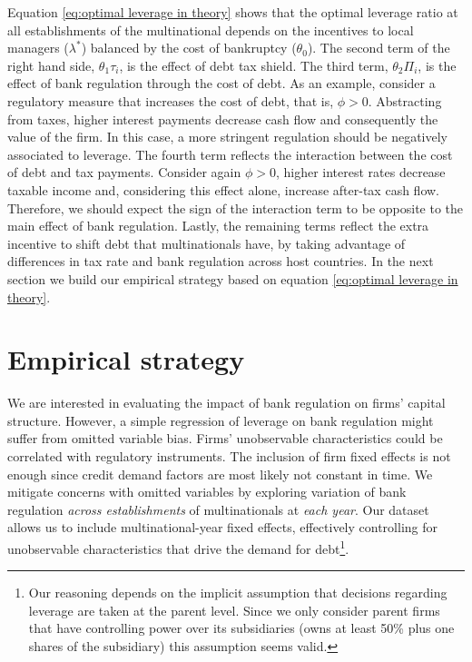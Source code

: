 \documentclass[12pt]{article}
\begin{document}
    Equation \ref{eq:optimal leverage in theory} shows that the optimal leverage ratio at all establishments of the multinational depends on the incentives to local managers ($\lambda^*$) balanced by the cost of bankruptcy ($\theta_0$). The second term of the right hand side, $\theta_1\tau_i$, is the effect of debt tax shield. The third term, $\theta_2\Pi_i$, is the effect of bank regulation through the cost of debt. As an example, consider a regulatory measure that increases the cost of debt, that is, $\phi>0$. Abstracting from taxes, higher interest payments decrease cash flow and consequently the value of the firm. In this case, a more stringent regulation should be negatively associated to leverage. The fourth term reflects the interaction between the cost of debt and tax payments. Consider again $\phi>0$, higher interest rates decrease taxable income and, considering this effect alone, increase after-tax cash flow. Therefore, we should expect the sign of the interaction term to be opposite to the main effect of bank regulation. Lastly, the remaining terms reflect the extra incentive to shift debt that multinationals have, by taking advantage of differences in tax rate and bank regulation across host countries. In the next section we build our empirical strategy based on equation \ref{eq:optimal leverage in theory}.

    	\section{Empirical strategy}
    \label{sec:strategy}

    We are interested in evaluating the impact of bank regulation on firms' capital structure. However, a simple regression of leverage on bank regulation might suffer from omitted variable bias. Firms' unobservable characteristics could be correlated with regulatory instruments. The inclusion of firm fixed effects is not enough since credit demand factors are most likely not constant in time. We mitigate concerns with omitted variables by exploring variation of bank regulation \textit{across establishments} of multinationals at \textit{each year}. Our dataset allows us to include multinational-year fixed effects, effectively controlling for unobservable characteristics that drive the demand for debt\footnote{Our reasoning depends on the implicit assumption that decisions regarding leverage are taken at the parent level. Since we only consider parent firms that have controlling power over its subsidiaries (owns at least 50\% plus one shares of the subsidiary) this assumption seems valid.}.
\end{document}
